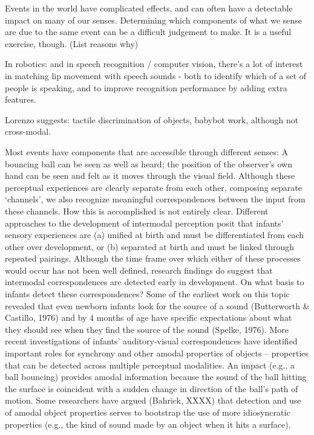 
Events in the world have complicated effects, and can often have
a detectable impact on many of our senses.  Determining which
components of what we sense are due to the same event can be a 
difficult judgement to make.  It is a useful exercise, though.
(List reasons why)


\cite{lewkowicz00development}
\cite{lewkowicz80crossmodal}
\cite{lewkowicz04learning}
\cite{bahrick04development}
\cite{hernandez01development}
\cite{bahrick03development}
\cite{bahrick00intersensory}
\cite{gibson86ecological}
\cite{prince05synching}

In robotics: and in speech recognition / computer vision, there's
a lot of interest in matching lip movement with speech sounds - 
both to identify which of a set of people is speaking, and to
improve recognition performance by adding extra features.

Lorenzo suggests: tactile discrimination of objects, babybot work,
although not cross-modal.

Most events have components that are accessible through different senses:  A bouncing ball can be seen as well as heard; the position of the observer's own hand can be seen and felt as it moves through the visual field.  Although these perceptual experiences are clearly separate from each other, composing separate `channels', we also recognize meaningful correspondences between the input from these channels.  How this is accomplished is not entirely clear.  Different approaches to the development of intermodal perception posit that infants' sensory experiences are (a) unified at birth and must be differentiated from each other over development, or (b) separated at birth and must be linked through repeated pairings. Although the time frame over which either of these processes would occur has not been well defined, research findings do suggest that intermodal correspondences are detected early in development.  
	On what basis to infants detect these correspondences?  Some of the earliest work on this topic revealed that even newborn infants look for the source of a sound (Butterworth \& Castillo, 1976) and by 4 months of age have specific expectations about what they should see when they find the source of the sound (Spelke, 1976).  More recent investigations of infants' auditory-visual correspondences have identified important roles for synchrony and other amodal properties of objects -- properties that can be detected across multiple perceptual modalities.  An impact (e.g., a ball bouncing) provides amodal information because the sound of the ball hitting the surface is coincident with a sudden change in direction of the ball's path of motion.  Some researchers have argued (Bahrick, XXXX) that detection and use of amodal object properties serves to bootstrap the use of more idiosyncratic properties (e.g., the kind of sound made by an object when it hits a surface).  


